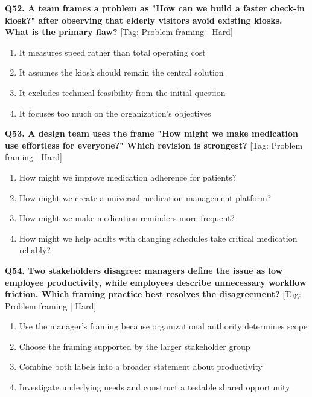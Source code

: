 \noindent\textbf{Q52. A team frames a problem as "How can we build a faster check-in kiosk?" after observing that elderly visitors avoid existing kiosks. What is the primary flaw?} \hfill [Tag: Problem framing | Hard]
\begin{enumerate}[label=(\alph*),topsep=2pt,itemsep=1pt,partopsep=0pt,parsep=0pt]
    \item {It measures speed rather than total operating cost}
    \item {It assumes the kiosk should remain the central solution}
    \item {It excludes technical feasibility from the initial question}
    \item {It focuses too much on the organization's objectives}
\end{enumerate}
\vspace{2mm}

\noindent\textbf{Q53. A design team uses the frame "How might we make medication use effortless for everyone?" Which revision is strongest?} \hfill [Tag: Problem framing | Hard]
\begin{enumerate}[label=(\alph*),topsep=2pt,itemsep=1pt,partopsep=0pt,parsep=0pt]
    \item {How might we improve medication adherence for patients?}
    \item {How might we create a universal medication-management platform?}
    \item {How might we make medication reminders more frequent?}
    \item {How might we help adults with changing schedules take critical medication reliably?}
\end{enumerate}
\vspace{2mm}

\noindent\textbf{Q54. Two stakeholders disagree: managers define the issue as low employee productivity, while employees describe unnecessary workflow friction. Which framing practice best resolves the disagreement?} \hfill [Tag: Problem framing | Hard]
\begin{enumerate}[label=(\alph*),topsep=2pt,itemsep=1pt,partopsep=0pt,parsep=0pt]
    \item {Use the manager's framing because organizational authority determines scope}
    \item {Choose the framing supported by the larger stakeholder group}
    \item {Combine both labels into a broader statement about productivity}
    \item {Investigate underlying needs and construct a testable shared opportunity}
\end{enumerate}
\vspace{2mm}

